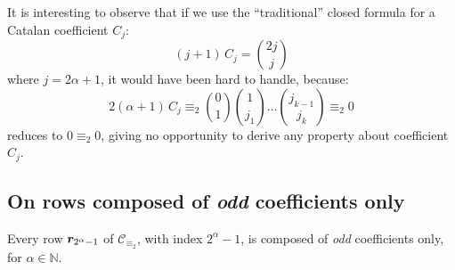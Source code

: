 It is interesting to observe that if we use the ``traditional'' closed formula
for a Catalan coefficient $C_{j}$:
\begin{displaymath}
    (j+1)\,C_{j} = {{2j}\choose{j}}
\end{displaymath}
where $j=2\alpha+1$, it would have been hard to handle, because:
\begin{displaymath}
    2(\alpha+1)\,C_{j}\equiv_{2} {{0}\choose{1}}{{1}\choose{j_{1}}}
            \ldots{{j_{k-1}}\choose{j_{k}}} \equiv_{2} 0
\end{displaymath}
reduces to $0\equiv_{2}0$, giving no opportunity to derive any
property about coefficient $C_{j}$.



\subsection{On rows composed of \emph{odd} coefficients only}

\begin{theorem}
    Every row $\boldsymbol{r}_{2^{\alpha}-1}$ of $\mathcal{C}_{\equiv_{2}}$, with index $2^{\alpha}-1$,
    is composed of \emph{odd} coefficients only, for $\alpha\in\mathbb{N}$.
    \label{thm:odd:coeff:only:on:last:but:one:row}
\end{theorem}

